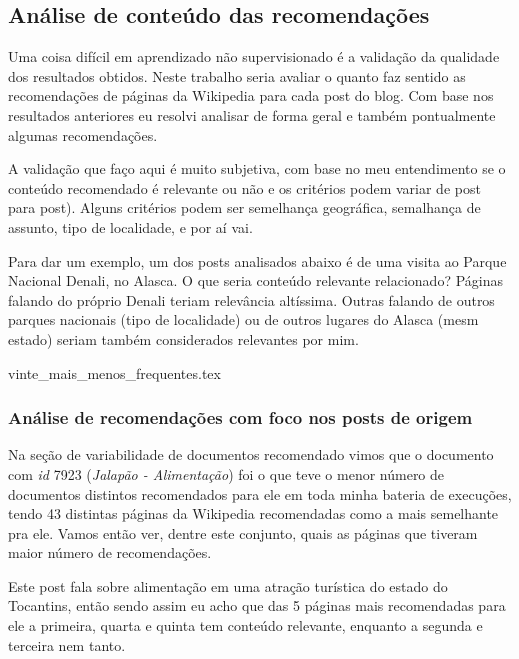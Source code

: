 \subsection{Análise de conteúdo das recomendações}

Uma coisa difícil em aprendizado não supervisionado é a validação da qualidade dos resultados obtidos. Neste trabalho seria avaliar o quanto faz sentido as recomendações 
de páginas da Wikipedia para cada post do blog. Com base nos resultados anteriores eu resolvi analisar de forma geral e também pontualmente algumas
recomendações. 

A validação que faço aqui é muito subjetiva, com base no meu entendimento se o conteúdo recomendado é relevante ou não e os critérios
podem variar de post para post). Alguns critérios podem ser semelhança geográfica, semalhança de assunto, tipo de localidade, e por aí vai.

Para dar um exemplo, um dos posts analisados abaixo é de uma visita ao Parque Nacional Denali, no Alasca. O que seria conteúdo relevante relacionado?
Páginas falando do próprio Denali teriam relevância altíssima. Outras falando de outros parques nacionais (tipo de localidade) ou de outros lugares
do Alasca (mesm estado) seriam também considerados relevantes por mim.

{vinte_mais_menos_frequentes.tex}

\subsubsection{Análise de recomendações com foco nos posts de origem}

Na seção de variabilidade de documentos recomendado vimos que o documento com \textit{id} 7923 (\textit{Jalapão - Alimentação}) foi o que teve o menor número de documentos distintos recomendados
para ele em toda minha bateria de execuções, tendo 43 distintas páginas da Wikipedia recomendadas como a mais semelhante pra ele. Vamos então ver,
dentre este conjunto, quais as páginas que tiveram maior número de recomendações.

Este post fala sobre alimentação em uma atração turística do estado do Tocantins, então sendo assim eu acho que das 5 páginas mais recomendadas para 
ele a primeira, quarta e quinta tem conteúdo relevante, enquanto a segunda e terceira nem tanto.

